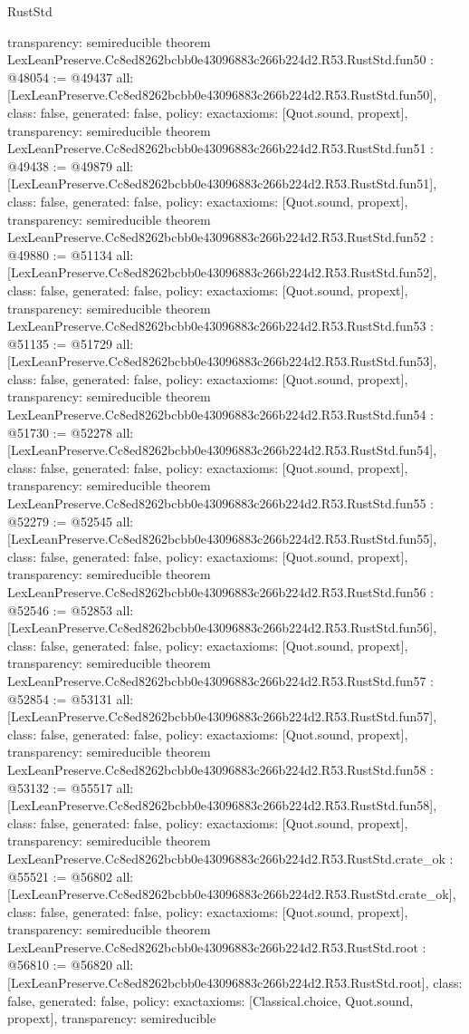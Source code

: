 \begin{lexlean}{RustStd}
\begin{coremodule}
{  transparency: semireducible
}
theorem LexLeanPreserve.Cc8ed8262bcbb0e43096883c266b224d2.R53.RustStd.fun50 : @48054 := @49437 {
  all: [LexLeanPreserve.Cc8ed8262bcbb0e43096883c266b224d2.R53.RustStd.fun50],
  class: false,
  generated: false,
  policy: exact{axioms: [Quot.sound, propext]},
  transparency: semireducible
}
theorem LexLeanPreserve.Cc8ed8262bcbb0e43096883c266b224d2.R53.RustStd.fun51 : @49438 := @49879 {
  all: [LexLeanPreserve.Cc8ed8262bcbb0e43096883c266b224d2.R53.RustStd.fun51],
  class: false,
  generated: false,
  policy: exact{axioms: [Quot.sound, propext]},
  transparency: semireducible
}
theorem LexLeanPreserve.Cc8ed8262bcbb0e43096883c266b224d2.R53.RustStd.fun52 : @49880 := @51134 {
  all: [LexLeanPreserve.Cc8ed8262bcbb0e43096883c266b224d2.R53.RustStd.fun52],
  class: false,
  generated: false,
  policy: exact{axioms: [Quot.sound, propext]},
  transparency: semireducible
}
theorem LexLeanPreserve.Cc8ed8262bcbb0e43096883c266b224d2.R53.RustStd.fun53 : @51135 := @51729 {
  all: [LexLeanPreserve.Cc8ed8262bcbb0e43096883c266b224d2.R53.RustStd.fun53],
  class: false,
  generated: false,
  policy: exact{axioms: [Quot.sound, propext]},
  transparency: semireducible
}
theorem LexLeanPreserve.Cc8ed8262bcbb0e43096883c266b224d2.R53.RustStd.fun54 : @51730 := @52278 {
  all: [LexLeanPreserve.Cc8ed8262bcbb0e43096883c266b224d2.R53.RustStd.fun54],
  class: false,
  generated: false,
  policy: exact{axioms: [Quot.sound, propext]},
  transparency: semireducible
}
theorem LexLeanPreserve.Cc8ed8262bcbb0e43096883c266b224d2.R53.RustStd.fun55 : @52279 := @52545 {
  all: [LexLeanPreserve.Cc8ed8262bcbb0e43096883c266b224d2.R53.RustStd.fun55],
  class: false,
  generated: false,
  policy: exact{axioms: [Quot.sound, propext]},
  transparency: semireducible
}
theorem LexLeanPreserve.Cc8ed8262bcbb0e43096883c266b224d2.R53.RustStd.fun56 : @52546 := @52853 {
  all: [LexLeanPreserve.Cc8ed8262bcbb0e43096883c266b224d2.R53.RustStd.fun56],
  class: false,
  generated: false,
  policy: exact{axioms: [Quot.sound, propext]},
  transparency: semireducible
}
theorem LexLeanPreserve.Cc8ed8262bcbb0e43096883c266b224d2.R53.RustStd.fun57 : @52854 := @53131 {
  all: [LexLeanPreserve.Cc8ed8262bcbb0e43096883c266b224d2.R53.RustStd.fun57],
  class: false,
  generated: false,
  policy: exact{axioms: [Quot.sound, propext]},
  transparency: semireducible
}
theorem LexLeanPreserve.Cc8ed8262bcbb0e43096883c266b224d2.R53.RustStd.fun58 : @53132 := @55517 {
  all: [LexLeanPreserve.Cc8ed8262bcbb0e43096883c266b224d2.R53.RustStd.fun58],
  class: false,
  generated: false,
  policy: exact{axioms: [Quot.sound, propext]},
  transparency: semireducible
}
theorem LexLeanPreserve.Cc8ed8262bcbb0e43096883c266b224d2.R53.RustStd.crate_ok : @55521 := @56802 {
  all: [LexLeanPreserve.Cc8ed8262bcbb0e43096883c266b224d2.R53.RustStd.crate_ok],
  class: false,
  generated: false,
  policy: exact{axioms: [Quot.sound, propext]},
  transparency: semireducible
}
theorem LexLeanPreserve.Cc8ed8262bcbb0e43096883c266b224d2.R53.RustStd.root : @56810 := @56820 {
  all: [LexLeanPreserve.Cc8ed8262bcbb0e43096883c266b224d2.R53.RustStd.root],
  class: false,
  generated: false,
  policy: exact{axioms: [Classical.choice, Quot.sound, propext]},
  transparency: semireducible
}


\end{coremodule}
\end{lexlean}
